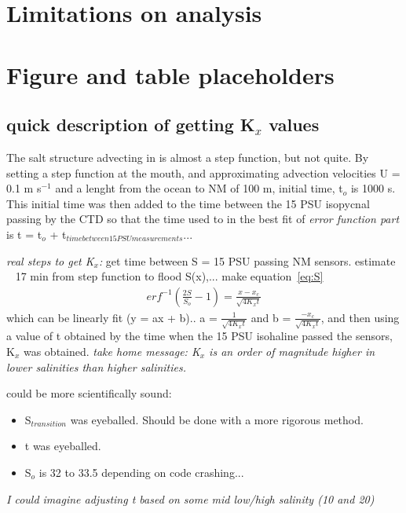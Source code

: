 \section{Limitations on analysis}

\section{Figure and table placeholders}



\subsection{quick description of getting K$_x$ values}
The salt structure advecting in is almost a step function, but not quite. By setting a step function at the mouth, and approximating advection velocities U = 0.1 m s$^{-1}$ and a lenght from the ocean to NM of 100 m, initial time, t$_o$ is 1000 s. This initial time was then added to the time between the 15 PSU isopycnal passing by the CTD so that the time used to in the best fit of \emph{error function part} is t = t$_o$ + t$_{time between 15 PSU measurements}$... 

\emph{real steps to get K$_x$:} get time between S = 15 PSU passing NM sensors.  estimate ~ 17 min from step function to flood S(x),... make equation~\ref{eq:S} 
\begin{eqnarray}
erf^{-1}(\frac{2S}{S_o}-1) = \frac{x-x_c}{\sqrt{4K_xt}} \label{eq:linfitS}
\end{eqnarray}
which can be linearly fit (y = ax + b).. a = $\frac{1}{\sqrt{4K_xt}}$ and b = $\frac{-x_c}{\sqrt{4K_xt}}$, and then using a value of t obtained by the time when the 15 PSU isohaline passed the sensors, K$_x$ was obtained.  \emph{take home message: K$_x$ is an order of magnitude higher in lower salinities than higher salinities. }

could be more scientifically sound:
\begin{itemize}
	\item S$_{transition}$ was eyeballed. Should be done with a more rigorous method. 
	\item t was eyeballed.
	\item S$_o$ is 32 to 33.5 depending on code crashing... 
\end{itemize}

\emph{I could imagine adjusting t based on some mid low/high salinity (10 and 20)}

\renewcommand{\arraystretch}{1.3}

